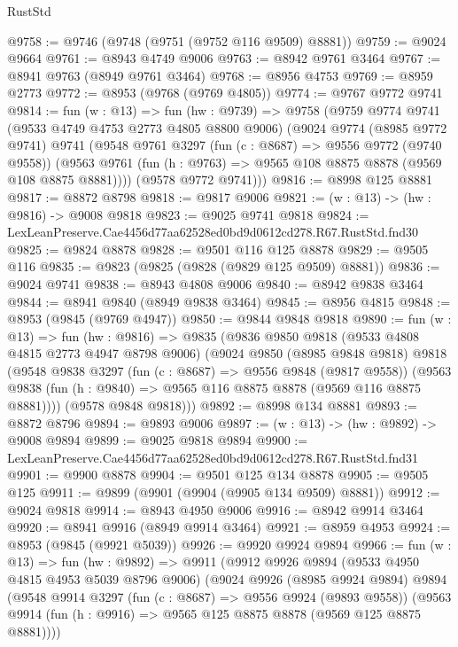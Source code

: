 \begin{lexlean}{RustStd}
\begin{coremodule}
@9758 := @9746 (@9748 (@9751 (@9752 @116 @9509) @8881))
@9759 := @9024 @9664
@9761 := @8943 @4749 @9006
@9763 := @8942 @9761 @3464
@9767 := @8941 @9763 (@8949 @9761 @3464)
@9768 := @8956 @4753
@9769 := @8959 @2773
@9772 := @8953 (@9768 (@9769 @4805))
@9774 := @9767 @9772 @9741
@9814 := fun (w : @13) =>
  fun (hw : @9739) =>
  @9758
    (@9759
      @9774
      @9741
      (@9533 @4749 @4753 @2773 @4805 @8800 @9006)
      (@9024
        @9774
        (@8985 @9772 @9741)
        @9741
        (@9548
          @9761
          @3297
          (fun (c : @8687) => @9556 @9772 (@9740 @9558))
          (@9563 @9761 (fun (h : @9763) => @9565 @108 @8875 @8878 (@9569 @108 @8875 @8881))))
        (@9578 @9772 @9741)))
@9816 := @8998 @125 @8881
@9817 := @8872 @8798
@9818 := @9817 @9006
@9821 := (w : @13) -> (hw : @9816) -> @9008 @9818
@9823 := @9025 @9741 @9818
@9824 := LexLeanPreserve.Cae4456d77aa62528ed0bd9d0612cd278.R67.RustStd.fnd30
@9825 := @9824 @8878
@9828 := @9501 @116 @125 @8878
@9829 := @9505 @116
@9835 := @9823 (@9825 (@9828 (@9829 @125 @9509) @8881))
@9836 := @9024 @9741
@9838 := @8943 @4808 @9006
@9840 := @8942 @9838 @3464
@9844 := @8941 @9840 (@8949 @9838 @3464)
@9845 := @8956 @4815
@9848 := @8953 (@9845 (@9769 @4947))
@9850 := @9844 @9848 @9818
@9890 := fun (w : @13) =>
  fun (hw : @9816) =>
  @9835
    (@9836
      @9850
      @9818
      (@9533 @4808 @4815 @2773 @4947 @8798 @9006)
      (@9024
        @9850
        (@8985 @9848 @9818)
        @9818
        (@9548
          @9838
          @3297
          (fun (c : @8687) => @9556 @9848 (@9817 @9558))
          (@9563 @9838 (fun (h : @9840) => @9565 @116 @8875 @8878 (@9569 @116 @8875 @8881))))
        (@9578 @9848 @9818)))
@9892 := @8998 @134 @8881
@9893 := @8872 @8796
@9894 := @9893 @9006
@9897 := (w : @13) -> (hw : @9892) -> @9008 @9894
@9899 := @9025 @9818 @9894
@9900 := LexLeanPreserve.Cae4456d77aa62528ed0bd9d0612cd278.R67.RustStd.fnd31
@9901 := @9900 @8878
@9904 := @9501 @125 @134 @8878
@9905 := @9505 @125
@9911 := @9899 (@9901 (@9904 (@9905 @134 @9509) @8881))
@9912 := @9024 @9818
@9914 := @8943 @4950 @9006
@9916 := @8942 @9914 @3464
@9920 := @8941 @9916 (@8949 @9914 @3464)
@9921 := @8959 @4953
@9924 := @8953 (@9845 (@9921 @5039))
@9926 := @9920 @9924 @9894
@9966 := fun (w : @13) =>
  fun (hw : @9892) =>
  @9911
    (@9912
      @9926
      @9894
      (@9533 @4950 @4815 @4953 @5039 @8796 @9006)
      (@9024
        @9926
        (@8985 @9924 @9894)
        @9894
        (@9548
          @9914
          @3297
          (fun (c : @8687) => @9556 @9924 (@9893 @9558))
          (@9563 @9914 (fun (h : @9916) => @9565 @125 @8875 @8878 (@9569 @125 @8875 @8881))))

\end{coremodule}
\end{lexlean}
